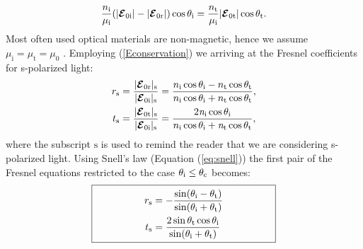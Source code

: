 \begin{equation}
\frac{n_{\textrm{i}}}{\mu_{\textrm{i}}}(|\boldsymbol{\mathcal{E}}_{0\textrm{i}}|-|\boldsymbol{\mathcal{E}}_{0\textrm{r}}|)\cos\theta_{\textrm{i}} = \frac{n_{\textrm{t}}}{\mu_{\textrm{i}}}|\boldsymbol{\mathcal{E}}_{0\textrm{t}}|\cos\theta_{\textrm{t}}.
\end{equation}
Most often used optical materials are non-magnetic, hence we assume $\mu_{\textrm{i}}=\mu_{\textrm{t}}=\mu_{0}$ \cite{lvovsky2013fresnel}. Employing (\ref{Econservation}) we arriving at the Fresnel coefficients for s-polarized light:
\begin{equation} \label{Fresnel_perpendicular}
\begin{split}
r_{\textrm{s}} & =\frac{|\boldsymbol{\mathcal{E}}_{0 \textrm{r}}|_{\textrm{s}}}{|\boldsymbol{\mathcal{E}}_{0\textrm{i}}|_\textrm{s}} = 
\frac{n_\textrm{i}\cos\theta_\textrm{i}-n_\textrm{t} \cos\theta_\textrm{t}}{n_\textrm{i}
\cos\theta_\textrm{i}+n_\textrm{t}\cos\theta_\textrm{t}},\\
t_{\textrm{s}} & = \frac{|\boldsymbol{\mathcal{E}}_{0 \textrm{t}}|_\textrm{s}}{|\boldsymbol{\mathcal{E}}_{0\textrm{i}}|_\textrm{s}} 
=\frac{2\textit{n}_\textrm{i}\cos\theta_\textrm{i}}{n_\textrm{i}\cos\theta_\textrm{i}+\textit{n}_\textrm{t}\cos\theta_\textrm{t}},\\
\end{split}
\end{equation}
where the subscript $\textrm{s}$ is used to remind the reader that we are considering s-polarized light. 
Using Snell's law (Equation (\ref{eq:snell})) the first pair of the Fresnel equations restricted to the case $\theta_\textrm{i}\leq\theta_\textrm{c}$ becomes:
\begin{equation}
\fbox{\begin{minipage}{18em}
\begin{equation*} \label{simple_Fresnel}
\begin{split}
r_{\textrm{s}} & = -\frac{\sin(\myangle_\textrm{i}-\myangle_\textrm{t})}{\sin(\myangle_\textrm{i}+\myangle_\textrm{t})}\\
t_{\textrm{s}} & = \frac{2\sin \myangle_\textrm{t} \cos \myangle_\textrm{i}}{\sin(\myangle_\textrm{i}+\myangle_\textrm{t})}
\end{split}
\end{equation*}
\end{minipage}}
\end{equation}

